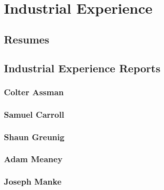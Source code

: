 
\chapter{Industrial Experience}

\section{Resumes}


%     
%     
%     

\section{Industrial Experience Reports}

\subsection{Colter Assman}


\subsection{Samuel Carroll}


\subsection{Shaun Greunig}


\subsection{Adam Meaney}


\subsection{Joseph Manke}

